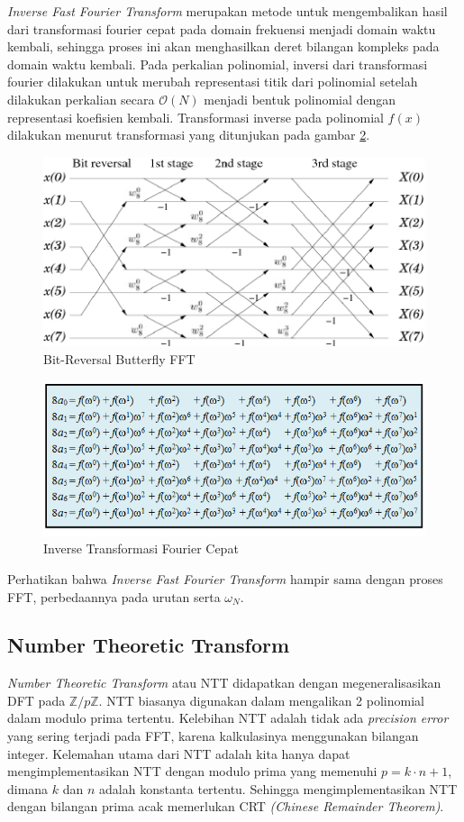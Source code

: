 \textit{Inverse Fast Fourier Transform} merupakan metode untuk mengembalikan hasil dari transformasi fourier cepat pada domain frekuensi menjadi domain waktu kembali, sehingga proses ini akan menghasilkan deret bilangan kompleks pada domain waktu kembali. Pada perkalian polinomial, inversi dari transformasi fourier dilakukan untuk merubah representasi titik dari polinomial setelah dilakukan perkalian secara $ \mathcal{O}{(N)} $ menjadi bentuk polinomial dengan representasi koefisien kembali. Transformasi inverse pada polinomial $ f(x) $ dilakukan menurut transformasi yang ditunjukan pada gambar \ref{fig:inverse-fft}.
\begin{figure}
	\Centering
	\includegraphics [scale=0.7]{bab2/img/bit-reverse-fft-butterfly}
	\caption {Bit-Reversal Butterfly FFT}
	\label {fig:bit-reverse-fft-butterfly}
\end{figure}

\begin{figure}
	\Centering
	\includegraphics [scale=0.6]{bab2/img/inverse-fft}
	\caption {Inverse Transformasi Fourier Cepat}
	\label {fig:inverse-fft}
\end{figure}
Perhatikan bahwa \textit{Inverse Fast Fourier Transform} hampir sama dengan proses FFT, perbedaannya pada urutan serta $ \omega_N $.

\subsection{Number Theoretic Transform} \label{ssec:ntt}
\textit{Number Theoretic Transform} atau NTT didapatkan dengan megeneralisasikan DFT pada $ \mathbb{Z}/p\mathbb{Z} $. NTT biasanya digunakan dalam mengalikan 2 polinomial dalam modulo prima tertentu. Kelebihan NTT adalah tidak ada \textit{precision error} yang sering terjadi pada FFT, karena kalkulasinya menggunakan bilangan integer. Kelemahan utama dari NTT adalah kita hanya dapat mengimplementasikan NTT dengan modulo prima yang memenuhi $ p = k \cdot n + 1 $, dimana $ k $ dan $ n $ adalah konstanta tertentu. Sehingga mengimplementasikan NTT dengan bilangan prima acak memerlukan CRT \textit{(Chinese Remainder Theorem)}.

